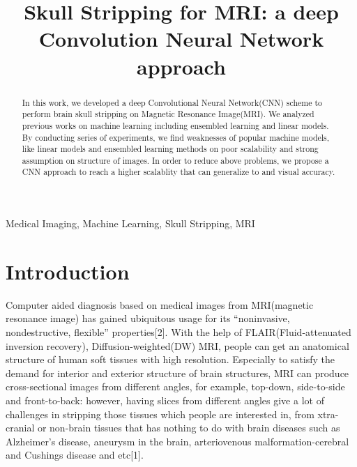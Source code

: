\documentclass[conference]{IEEEtran}
\begin{document}
\title{Skull Stripping for MRI: a deep Convolution Neural Network approach}

\author{
\and
{}
}

\maketitle

\begin{abstract}
In this work, we developed a deep Convolutional Neural Network(CNN) scheme to perform brain skull stripping on Magnetic Resonance Image(MRI). We analyzed previous works on machine learning including ensembled learning and linear models. By conducting series of experiments, we find weaknesses of popular machine models, like linear models and ensembled learning methods on poor scalability and strong assumption on structure of images. In order to reduce above problems, we propose a CNN approach to reach a higher scalablity that can generalize to and visual accuracy. 

\end{abstract}

\begin{IEEEkeywords}
Medical Imaging, Machine Learning, Skull Stripping, MRI
\end{IEEEkeywords}

\section{Introduction}
Computer aided diagnosis based on medical images from MRI(magnetic resonance image) has gained ubiquitous usage for its “noninvasive, nondestructive, flexible” properties[2]. With the help of FLAIR(Fluid-attenuated inversion recovery), Diffusion-weighted(DW) MRI, people can get an anatomical structure of human soft tissues with high resolution. Especially to satisfy the demand for interior and exterior structure of brain structures, MRI can produce cross-sectional images from different angles, for example, top-down, side-to-side and front-to-back: however, having slices from different angles give a lot of challenges in stripping those tissues which people are interested in, from xtra-cranial or non-brain tissues that has nothing to do with brain diseases such as Alzheimer’s disease, aneurysm in the brain, arteriovenous malformation-cerebral and Cushings disease and etc[1]. 
\end{document}
